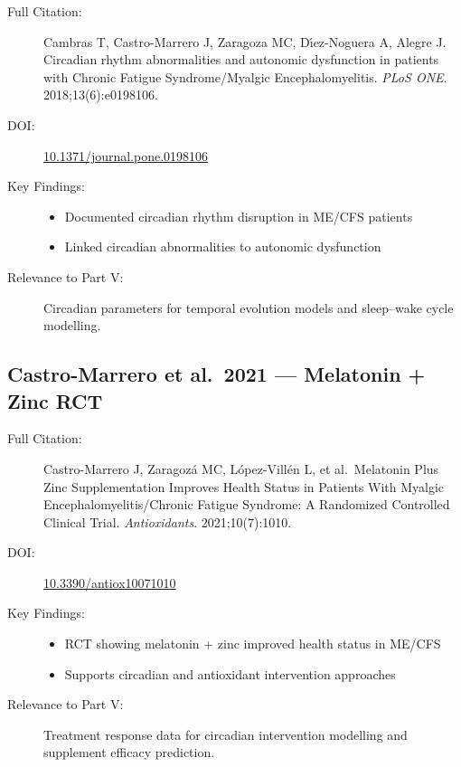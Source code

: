 \begin{description}
    \item[Full Citation:] Cambras T, Castro-Marrero J, Zaragoza MC, D\'{\i}ez-Noguera A, Alegre J. Circadian rhythm abnormalities and autonomic dysfunction in patients with Chronic Fatigue Syndrome/Myalgic Encephalomyelitis. \textit{PLoS ONE}. 2018;13(6):e0198106. \cite{cambras2018circadian}
    \item[DOI:] \href{https://doi.org/10.1371/journal.pone.0198106}{10.1371/journal.pone.0198106}
    \item[Key Findings:]
    \begin{itemize}
        \item Documented circadian rhythm disruption in ME/CFS patients
        \item Linked circadian abnormalities to autonomic dysfunction
    \end{itemize}
    \item[Relevance to Part V:] Circadian parameters for temporal evolution models and sleep--wake cycle modelling.
\end{description}

\subsection{Castro-Marrero et al.\ 2021 --- Melatonin + Zinc RCT}

\begin{description}
    \item[Full Citation:] Castro-Marrero J, Zaragoz\'{a} MC, L\'{o}pez-Vill\'{e}n L, et al.\ Melatonin Plus Zinc Supplementation Improves Health Status in Patients With Myalgic Encephalomyelitis/Chronic Fatigue Syndrome: A Randomized Controlled Clinical Trial. \textit{Antioxidants}. 2021;10(7):1010. \cite{castromarrero2021melatonin}
    \item[DOI:] \href{https://doi.org/10.3390/antiox10071010}{10.3390/antiox10071010}
    \item[Key Findings:]
    \begin{itemize}
        \item RCT showing melatonin + zinc improved health status in ME/CFS
        \item Supports circadian and antioxidant intervention approaches
    \end{itemize}
    \item[Relevance to Part V:] Treatment response data for circadian intervention modelling and supplement efficacy prediction.
\end{description}

